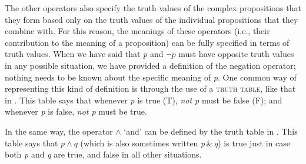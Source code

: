 The other operators also specify the truth values of the complex propositions that they form based only on the truth values of the individual propositions that they combine with. For this reason, the meanings of these operators (i.e., their contribution to the meaning of a proposition) can be fully specified in terms of truth values. When we have said that \textit{p} and $\neg p$ must have opposite truth values in any possible situation, we have provided a definition of the negation operator; nothing needs to be known about the specific meaning of \textit{p}. One common way of representing this kind of definition is through the use of a \textsc{truth table}, like that in . This table says that whenever \textit{p} is true (\textsf{T}), \textit{not p} must be false (\textsf{F}); and whenever \textit{p} is false, \textit{not p} must be true.



In the same way, the operator $\wedge$ ‘and’ can be defined by the truth table in . This table says that $p \wedge q$ (which is also sometimes written \textit{p}\,\&\,\textit{q}) is true just in case both \textit{p} and \textit{q} are true, and false in all other situations.



